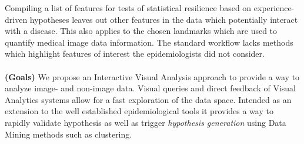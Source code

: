 \documentclass[journal]{style/vgtc} 			          %
\begin{document}
Compiling a list of features for tests of statistical resilience based on experience-driven hypotheses leaves out other features in the data which potentially interact with a disease.
%
This also applies to the chosen landmarks which are used to quantify medical image data information.
%
The standard workflow lacks methods which highlight features of interest the epidemiologists did not consider.
%
%
%
%
\\\\
\textbf{(Goals)}
We propose an Interactive Visual Analysis approach \cite{Thomas2005} to provide a way to analyze image- and non-image data.
%
Visual queries and direct feedback of Visual Analytics systems allow for a fast exploration of the data space.
%
Intended as an extension to the well established epidemiological tools it provides a way to rapidly validate hypothesis as well as trigger \emph{hypothesis generation} using Data Mining methods such as clustering.
\end{document}
